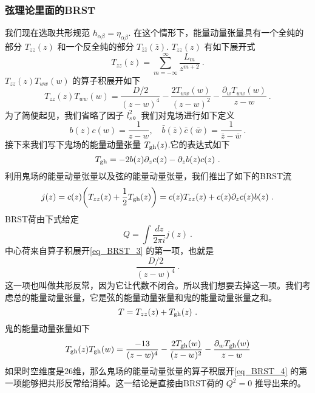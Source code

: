 \subsubsection{弦理论里面的BRST}
我们现在选取共形规范 $h_{\alpha\beta} = \eta_{\alpha\beta}$. 在这个情形下，能量动量张量具有一个全纯的部分 $T_{zz}(z)$ 和一个反全纯的部分 $T_{\bar z\bar z}(\bar z)$. $T_{zz}(z)$ 有如下展开式
\begin{equation}
T_{zz}(z) = \sum_{m=-\infty}^{\infty} \frac{L_{m}}{z^{m+2}}~.
\end{equation}
$T_{zz}(z)T_{ww}(w)$ 的算子积展开如下
\begin{equation}\label{eq_BRST_3}
T_{zz}(z)T_{ww}(w) = \frac{D/2}{(z-w)^4} - \frac{2T_{ww}(w)}{(z-w)^2} - \frac{\partial_wT_{ww}(w)}{z-w}~.
\end{equation}
为了简便起见，我们省略了因子 $l_s^2$。我们对鬼场进行如下定义
\begin{equation}
b(z)c(w) = \frac{1}{z-w},\quad \bar b (\bar z) \bar c (\bar w) = \frac{1}{\bar z- \bar w} ~.
\end{equation} 
接下来我们写下鬼场的能量动量张量 $T_{\rm gh}(z)$.它的表达式如下
\begin{equation}
T_{\rm gh} = -2 b(z) \partial_z c(z) - \partial_z b(z) c(z)~.
\end{equation}
利用鬼场的能量动量张量以及弦的能量动量张量，我们推出了如下的BRST流
\begin{equation}
j(z) = c(z) \bigg( T_{zz} (z) + \frac{1}{2} T_{\rm gh}(z) \bigg) = c(z) T_{zz} (z) + c(z) \partial_z c(z) b(z)~.
\end{equation}
BRST荷由下式给定
\begin{equation}
Q = \int \frac{dz}{2\pi i} j(z)~.
\end{equation}
中心荷来自算子积展开\autoref{eq_BRST_3} 的第一项，也就是
\begin{equation}
\frac{D/2}{(z-w)^4}~.
\end{equation}
这一项也叫做共形反常，因为它让代数不闭合。所以我们想要去掉这一项。我们考虑总的能量动量张量，它是弦的能量动量张量和鬼的能量动量张量之和。
\begin{equation}
T = T_{zz} (z) + T_{\rm gh} (z)~.
\end{equation}
鬼的能量动量张量如下
\begin{equation}\label{eq_BRST_4}
T_{\rm gh}(z) T_{\rm gh} (w) = \frac{-13}{(z-w)^4} - \frac{2T_{\rm gh} (w) }{(z-w)^2} - \frac{\partial_w T_{\rm gh}(w)}{z-w}
\end{equation}
如果时空维度是26维，那么鬼场的能量动量张量的算子积展开\autoref{eq_BRST_4} 的第一项能够把共形反常给消掉。这一结论是直接由BRST荷的 $Q^2=0$ 推导出来的。

